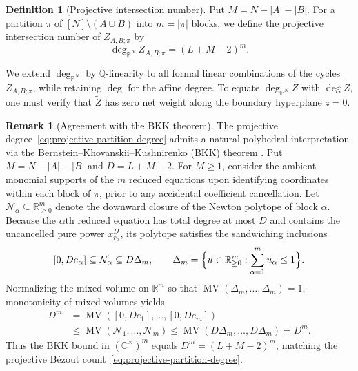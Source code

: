 \documentclass[11pt]{article}
\theoremstyle{definition}
\newtheorem{definition}[proposition]{Definition}
\newtheorem{remark}[proposition]{Remark}
\newcommand{\C}{\mathbb{C}}
\begin{document}
\begin{definition}[Projective intersection number]
	\label{def:projective-degree}
	Put $M=N-|A|-|B|$. For a partition $\pi$ of $[N]\setminus(A\cup B)$ into $m=|\pi|$ blocks, we define the projective intersection number of $Z_{A,B;\pi}$ by
	\begin{equation}\label{eq:projective-partition-degree}
		\boxed{\deg_{\mathbb{P}^N}Z_{A,B;\pi}=(L+M-2)^m.}
	\end{equation}
\end{definition}

We extend $\deg_{\mathbb{P}^N}$ by $\mathbb{Q}$-linearity to all formal linear combinations of the cycles $Z_{A,B;\pi}$, while retaining $\deg$ for the affine degree. To equate $\deg_{\mathbb{P}^N}\tilde{Z}$ with $\deg\tilde{Z}$, one must verify that $\tilde{Z}$ has zero net weight along the boundary hyperplane $z=0$.

\begin{remark}[Agreement with the BKK theorem]
The projective degree~\eqref{eq:projective-partition-degree} admits a natural polyhedral interpretation via the Bernstein--Khovanskii--Kushnirenko (BKK) theorem \cite[Chapter~3]{Sturmfels}. Put
$M=N-|A|-|B|$ and $D=L+M-2$. For $M\ge 1$, consider the ambient monomial
supports of the $m$ reduced equations upon identifying coordinates within
each block of $\pi$, prior to any accidental coefficient cancellation. Let
$\mathcal{N}_\alpha\subseteq\mathbb{R}_{\ge 0}^m$ denote the downward closure of the
Newton polytope of block $\alpha$. Because the $\alpha$th reduced equation has total degree at most $D$ and contains the uncancelled pure power
$x_{r_\alpha}^D$, its polytope satisfies the sandwiching inclusions
\[
[0,De_\alpha]\subseteq \mathcal{N}_\alpha\subseteq D\Delta_m,
\qquad
\Delta_m=\Bigl\{u\in\mathbb{R}_{\ge 0}^m:\sum_{\alpha=1}^m u_\alpha\le 1\Bigr\}.
\]
Normalizing the mixed volume on $\mathbb{R}^m$ so that
$\operatorname{MV}(\Delta_m,\ldots,\Delta_m)=1$, monotonicity of mixed volumes yields
\[
\begin{aligned}
	D^m
	&=\operatorname{MV}([0,De_1],\ldots,[0,De_m])\\
	&\le\operatorname{MV}(\mathcal{N}_1,\ldots,\mathcal{N}_m)
	\le\operatorname{MV}(D\Delta_m,\ldots,D\Delta_m)=D^m.
\end{aligned}
\]
Thus the BKK bound in $(\C^\times)^m$ equals $D^m=(L+M-2)^m$, matching the projective B\'ezout count~\eqref{eq:projective-partition-degree}.
\end{remark}
\end{document}
